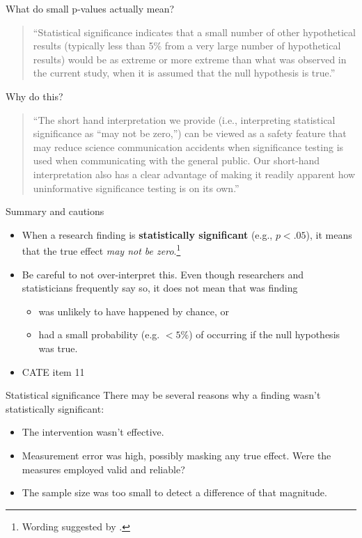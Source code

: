 \documentclass{beamer}
\begin{document}
%
\begin{frame}{What do small p-values actually mean?}
\begin{quote}
``Statistical significance indicates that a small
number of other hypothetical results (typically less than 5\%
from a very large number of hypothetical results) would be
as extreme or more extreme than what was observed in the
current study, when it is assumed that the null hypothesis is
true.'' \citep[p. 3]{Spence2018}
\end{quote}
\end{frame}

%
\begin{frame}{Why do this?}
\begin{quote}
``The short hand interpretation we provide (i.e., interpreting
statistical significance as “may not be zero,”) can be viewed
as a safety feature that may reduce science communication
accidents when significance testing is used when communicating
with the general public. Our short-hand interpretation also
has a clear advantage of making it readily apparent how
uninformative significance testing is on its own.'' \citep[p. 4]{Spence2018}
\end{quote}
\end{frame}

% 
\begin{frame}{Summary and cautions}
\begin{itemize}
	\item When a research finding is \textbf{statistically significant} (e.g., $p < .05$), it means that the true effect \emph{may not be zero}.\footnote{\tiny{Wording suggested by \citet{Spence2018}.}}
	\item Be careful to not over-interpret this. Even though researchers and statisticians frequently say so, it does not mean that was finding
		\begin{itemize} 
			\item was unlikely to have happened by chance, or
			\item had a small probability (e.g. $<5\%$) of occurring if the null hypothesis was true.
		\end{itemize}
	\item CATE item 11
	\end{itemize}
\end{frame}

% 
\begin{frame}{Statistical significance}
There may be several reasons why a finding wasn't statistically significant:
	\begin{itemize}
	\item The intervention wasn't effective.
	\item Measurement error was high, possibly masking any true effect. Were the measures employed valid and reliable?
	\item The sample size was too small to detect a difference of that magnitude.
	\end{itemize}
\end{frame}
\end{document}
